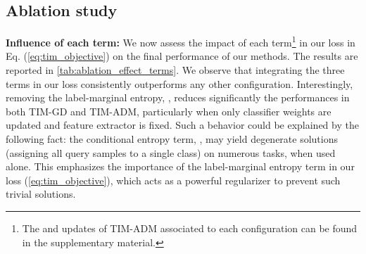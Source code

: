 \documentclass{article}
\begin{document}
    \subsection{Ablation study}

        \textbf{Influence of each term: }\label{sec:ablation_terms} We now assess the impact of each term\footnote{The  and  updates of TIM-ADM associated to each configuration can be found in the supplementary material.} in our loss in Eq. (\ref{eq:tim_objective}) on the final performance of our methods. The results are reported in \autoref{tab:ablation_effect_terms}. 
        We observe that integrating the three terms in our loss consistently outperforms any other configuration. Interestingly, removing the label-marginal entropy, , reduces significantly the performances in both TIM-GD and TIM-ADM, particularly when only classifier weights  are 
        updated and feature extractor  is fixed. 
Such a behavior could be explained by the following fact: the conditional entropy term, , may yield degenerate solutions (assigning all query samples to a single class) on numerous tasks, when used alone. 
This emphasizes the importance of the label-marginal entropy term  in our loss (\ref{eq:tim_objective}), which acts as a powerful regularizer to prevent such trivial solutions.
        
\end{document}
